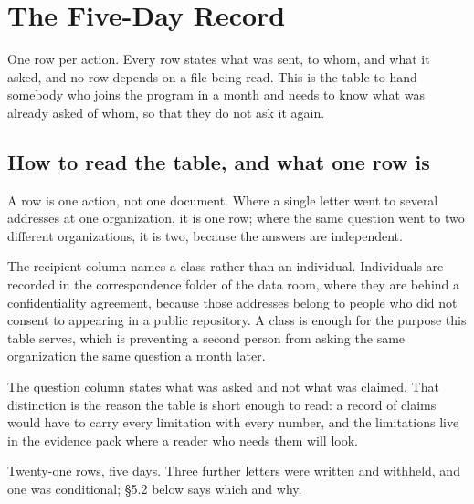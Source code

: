 \section{The Five-Day Record}

One row per action. Every row states what was sent, to whom, and what it asked,
and no row depends on a file being read. This is the table to hand somebody who
joins the program in a month and needs to know what was already asked of whom, so
that they do not ask it again.

\subsection{How to read the table, and what one row is}

A row is one action, not one document. Where a single letter went to several
addresses at one organization, it is one row; where the same question went to two
different organizations, it is two, because the answers are independent.

The recipient column names a class rather than an individual. Individuals are
recorded in the correspondence folder of the data room, where they are behind a
confidentiality agreement, because those addresses belong to people who did not
consent to appearing in a public repository. A class is enough for the purpose
this table serves, which is preventing a second person from asking the same
organization the same question a month later.

The question column states what was asked and not what was claimed. That
distinction is the reason the table is short enough to read: a record of claims
would have to carry every limitation with every number, and the limitations live
in the evidence pack where a reader who needs them will look.

Twenty-one rows, five days. Three further letters were written and withheld, and
one was conditional; \S5.2 below says which and why.

